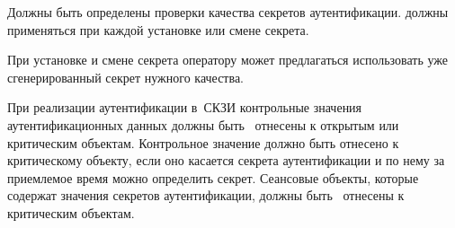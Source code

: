 \label{R.IA.PwdSet}
Должны быть определены  проверки качества 
секретов аутентификации.  должны применяться при каждой 
установке или смене секрета.

\begin{note}
При установке и смене секрета оператору может предлагаться использовать
уже сгенерированный секрет нужного качества.
\end{note}

\label{R.IA.AuthProtect}
При реализации  аутентификации в~СКЗИ контрольные значения 
аутентификационных данных должны быть~ отнесены к открытым
или критическим объектам.
%
Контрольное значение должно быть отнесено к критическому объекту, 
если оно касается секрета аутентификации и по нему за приемлемое
время можно определить секрет.
%
Сеансовые объекты, которые содержат значения секретов аутентификации,
должны быть~ отнесены к критическим объектам.

